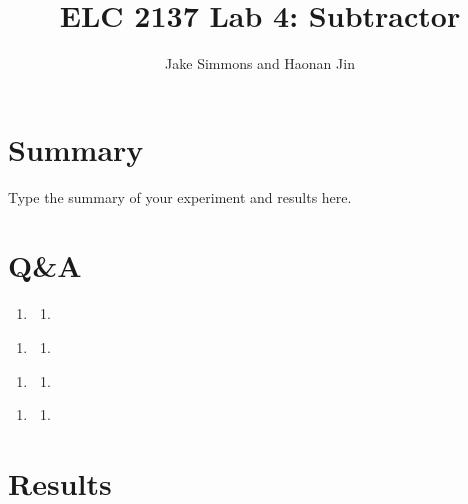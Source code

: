 \documentclass[11pt]{article}
\begin{document}
\title{ELC 2137 Lab 4: Subtractor}
\author{Jake Simmons and Haonan Jin }

\maketitle


\section*{Summary}

Type the summary of your experiment and results here.  


\section*{Q\&A}

\begin{enumerate}
	\item 
		\begin{enumerate}
			\item 
		\end{enumerate}
\end{enumerate}

\begin{enumerate}
	\item 
	\begin{enumerate}
		\item 
	\end{enumerate}
\end{enumerate}

\begin{enumerate}
	\item 
	\begin{enumerate}
		\item 
	\end{enumerate}
\end{enumerate}

\begin{enumerate}
	\item 
	\begin{enumerate}
		\item 
	\end{enumerate}
\end{enumerate}


\section*{Results}
\end{document}
